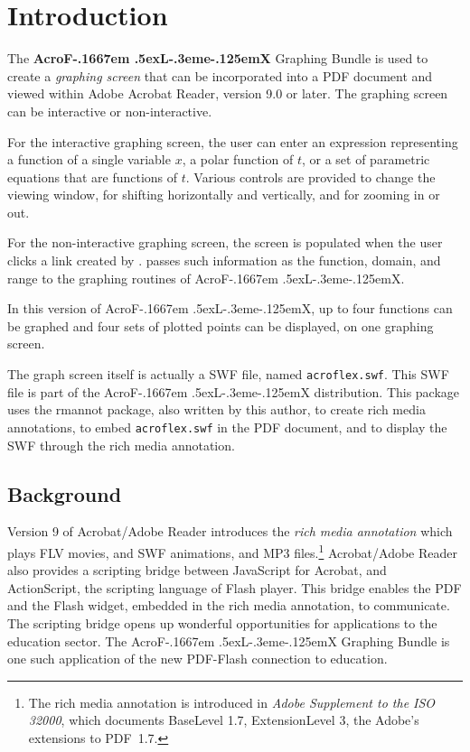 \documentclass{article}
\makeatletter
\let\pkg\textsf
\let\app\textsf
\def\AcroFLeX{AcroF\kern-.1667em
    \lower.5ex\hbox{L}\kern-.3eme\kern-.125emX\@}
\makeatother
\begin{document}
\maketitle

\tableofcontents
{}

\section{Introduction}

The \textbf{{\AcroFLeX}} Graphing Bundle is used to create a
\emph{graphing screen} that can be incorporated into a PDF document
and viewed within \app{Adobe Acrobat Reader}, version 9.0 or later. The graphing
screen can be interactive or non-interactive.

For the interactive graphing screen, the user can enter an
expression representing a function of a single variable $x$, a polar
function of $t$, or a set of parametric equations that are functions
of $t$. Various controls are provided to change the viewing window,
for shifting horizontally and vertically, and for zooming in or out.

For the non-interactive graphing screen, the screen is populated
when the user clicks a link created by .
 passes such information as the function,
domain, and range to the graphing routines of {\AcroFLeX}.

In this version of {\AcroFLeX}, up to four functions can be graphed
and four sets of plotted points can be displayed, on one graphing
screen.

The graph screen itself is actually a SWF file, named
\texttt{acroflex.swf}. This SWF file is part of the {\AcroFLeX}
distribution. This package uses the \pkg{rmannot} package, also
written by this author, to create rich media annotations, to embed
\texttt{acroflex.swf} in the PDF document, and to display the SWF through
the rich media annotation.

\subsection{Background}

Version 9 of Acrobat/Adobe Reader introduces the \textit{rich media
annotation} which plays FLV movies, and SWF animations, and MP3 files.\footnote{%
The rich media annotation is introduced in
\textsl{Adobe Supplement to the ISO 32000}, which documents
BaseLevel 1.7, ExtensionLevel 3, the Adobe's extensions to PDF~1.7.}
Acrobat/Adobe Reader also provides a scripting bridge between
JavaScript for Acrobat, and ActionScript, the scripting language of
Flash player. This bridge enables the PDF and the Flash widget,
embedded in the rich media annotation, to communicate. The scripting
bridge opens up wonderful opportunities for applications to the
education sector. The {\AcroFLeX} Graphing Bundle is one such
application of the new PDF-Flash connection to education.
\end{document}
